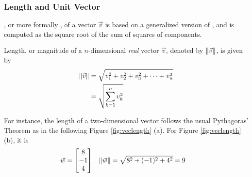 \subsubsection{Length and Unit Vector} , or more formally , of a vector $\vec{v}$ is based on a generalized version of , and is computed as the square root of the sum of squares of components.
\begin{defn}
\label{defn:vectorlength}
Length, or magnitude of a $n$-dimensional \textit{real} vector $\vec{v}$, denoted by $\norm{\vec{v}}$, is given by
\begin{subequations}
\label{eqn:veclength}
\begin{align}
\norm{\vec{v}} &= \sqrt{v_1^2 + v_2^2 + v_3^2 + \cdots + v_n^2} \\
&= \sqrt{\sum_{k=1}^{n} v_k^2}
\end{align}    
\end{subequations}
\end{defn}
For instance, the length of a two-dimensional vector follows the usual Pythagoras' Theorem as in the following Figure \ref{fig:veclength} (a). For Figure \ref{fig:veclength} (b), it is
\begin{align*}
\vec{w} &= 
\begin{bmatrix}
8 \\
-1 \\
4
\end{bmatrix}
& \norm{\vec{w}}&=
\sqrt{8^2 + (-1)^2 + 4^2} = 9 
\end{align*}
